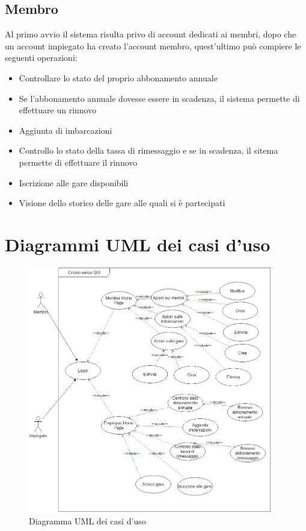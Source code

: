 \documentclass{report}
\begin{document}
    \subsection{Membro}
    Al primo avvio il sistema risulta privo di account dedicati ai membri, dopo che un account impiegato ha creato l'account membro, quest'ultimo può compiere le seguenti operazioni:
  \begin{itemize}
    \item Controllare lo stato del proprio abbonamento annuale
    \item Se l'abbonamento annuale dovesse essere in scadenza, il sistema permette di effettuare un rinnovo
    \item Aggiunta di imbarcazioni
    \item Controllo lo stato della tassa di rimessaggio e se in scadenza, il sitema permette di effettuare il rinnovo
    \item Iscrizione alle gare disponibili
    \item Visione dello storico delle gare alle quali si è partecipati
  \end{itemize}
    


    

    \pagebreak
    \section{Diagrammi UML dei casi d'uso} %
    \label{sec:Diagrammi UML dei casi d'uso}
    \begin{figure}[h!]
      \begin{center}
        \includegraphics[width=0.95\textwidth]{./images/uml_casi_uso.png}
      \end{center}
      \caption{Diagramma UML dei casi d'uso}
      \label{fig:uml_casi_uso}
    \end{figure}
    
\end{document}
